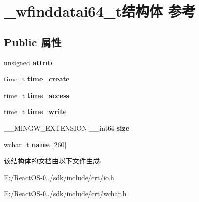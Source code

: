 \hypertarget{struct__wfinddatai64__t}{}\section{\+\_\+wfinddatai64\+\_\+t结构体 参考}
\label{struct__wfinddatai64__t}
\subsection*{Public 属性}
\begin{DoxyCompactItemize}
\item 
\mbox{\label{struct__wfinddatai64__t_a82dec27618c7ca12aacc8cad5502d3b5}} 
unsigned {\bfseries attrib}
\item 
\mbox{\label{struct__wfinddatai64__t_a235bafaf6bf5cfb1be6386d1b46baf05}} 
time\+\_\+t {\bfseries time\+\_\+create}
\item 
\mbox{\label{struct__wfinddatai64__t_a0c03ab10faeca8840a119a90538d7120}} 
time\+\_\+t {\bfseries time\+\_\+access}
\item 
\mbox{\label{struct__wfinddatai64__t_ac99a3ac884cfd6d4024a00d1a53f4f82}} 
time\+\_\+t {\bfseries time\+\_\+write}
\item 
\mbox{\label{struct__wfinddatai64__t_a83777740db25dfc1a57621779679ea16}} 
\+\_\+\+\_\+\+M\+I\+N\+G\+W\+\_\+\+E\+X\+T\+E\+N\+S\+I\+ON \+\_\+\+\_\+int64 {\bfseries size}
\item 
\mbox{\label{struct__wfinddatai64__t_a0b9649f7812c4261c801636d7e273484}} 
wchar\+\_\+t {\bfseries name} \mbox{[}260\mbox{]}
\end{DoxyCompactItemize}


该结构体的文档由以下文件生成\+:\begin{DoxyCompactItemize}
\item 
E\+:/\+React\+O\+S-\/0../sdk/include/crt/io.\+h\item 
E\+:/\+React\+O\+S-\/0../sdk/include/crt/wchar.\+h\end{DoxyCompactItemize}
